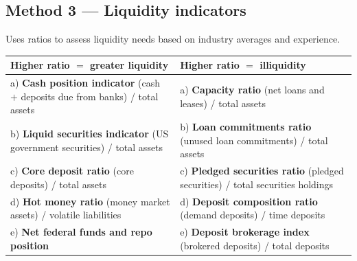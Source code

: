 \subsection{Method 3 — Liquidity indicators}

Uses ratios to assess liquidity needs based on industry averages and experience.

\begin{center}
\small
\begin{tabularx}{\textwidth}{@{}X X@{}}
\toprule
\rowcolor{PaleGreen}\textbf{Higher ratio $=$ greater liquidity} & \cellcolor{PaleRed}\textbf{Higher ratio $=$ illiquidity} \\
\midrule
a) \textbf{Cash position indicator} \newline (cash $+$ deposits due from banks) / total assets &
a) \textbf{Capacity ratio} \newline (net loans and leases) / total assets \\
\addlinespace
b) \textbf{Liquid securities indicator} \newline (US government securities) / total assets &
b) \textbf{Loan commitments ratio} \newline (unused loan commitments) / total assets \\
\addlinespace
c) \textbf{Core deposit ratio} \newline (core deposits) / total assets &
c) \textbf{Pledged securities ratio} \newline (pledged securities) / total securities holdings \\
\addlinespace
d) \textbf{Hot money ratio} \newline (money market assets) / volatile liabilities &
d) \textbf{Deposit composition ratio} \newline (demand deposits) / time deposits \\
\addlinespace
e) \textbf{Net federal funds and repo position} &
e) \textbf{Deposit brokerage index} \newline (brokered deposits) / total deposits \\
\bottomrule
\end{tabularx}
\end{center}

